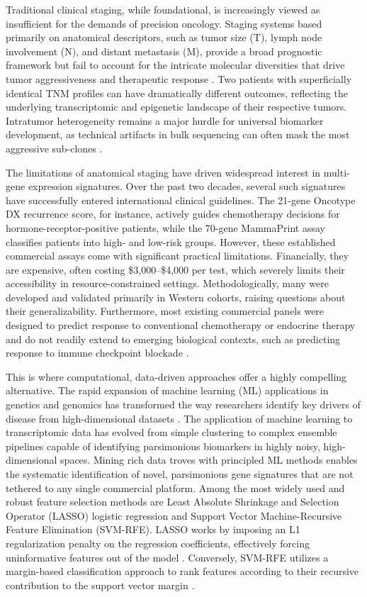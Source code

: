 \documentclass[a4paper,fleqn]{cas-sc}
\begin{document}
Traditional clinical staging, while foundational, is increasingly viewed as insufficient for the demands of precision oncology. Staging systems based primarily on anatomical descriptors, such as tumor size (T), lymph node involvement (N), and distant metastasis (M), provide a broad prognostic framework but fail to account for the intricate molecular diversities that drive tumor aggressiveness and therapeutic response \citep{waks2019}. Two patients with superficially identical TNM profiles can have dramatically different outcomes, reflecting the underlying transcriptomic and epigenetic landscape of their respective tumors. Intratumor heterogeneity remains a major hurdle for universal biomarker development, as technical artifacts in bulk sequencing can often mask the most aggressive sub-clones \citep{swanton2012}.

The limitations of anatomical staging have driven widespread interest in multi-gene expression signatures. Over the past two decades, several such signatures have successfully entered international clinical guidelines. The 21-gene Oncotype DX recurrence score, for instance, actively guides chemotherapy decisions for hormone-receptor-positive patients, while the 70-gene MammaPrint assay classifies patients into high- and low-risk groups. However, these established commercial assays come with significant practical limitations. Financially, they are expensive, often costing \$3,000--\$4,000 per test, which severely limits their accessibility in resource-constrained settings. Methodologically, many were developed and validated primarily in Western cohorts, raising questions about their generalizability. Furthermore, most existing commercial panels were designed to predict response to conventional chemotherapy or endocrine therapy and do not readily extend to emerging biological contexts, such as predicting response to immune checkpoint blockade \citep{parker2009, dai2017}.

This is where computational, data-driven approaches offer a highly compelling alternative. The rapid expansion of machine learning (ML) applications in genetics and genomics has transformed the way researchers identify key drivers of disease from high-dimensional datasets \citep{libbrecht2015}. The application of machine learning to transcriptomic data has evolved from simple clustering to complex ensemble pipelines capable of identifying parsimonious biomarkers in highly noisy, high-dimensional spaces. Mining rich data troves with principled ML methods enables the systematic identification of novel, parsimonious gene signatures that are not tethered to any single commercial platform. Among the most widely used and robust feature selection methods are Least Absolute Shrinkage and Selection Operator (LASSO) logistic regression and Support Vector Machine-Recursive Feature Elimination (SVM-RFE). LASSO works by imposing an L1 regularization penalty on the regression coefficients, effectively forcing uninformative features out of the model \citep{tibshirani1996}. Conversely, SVM-RFE utilizes a margin-based classification approach to rank features according to their recursive contribution to the support vector margin \citep{guyon2002, lazar2021}.
\end{document}
